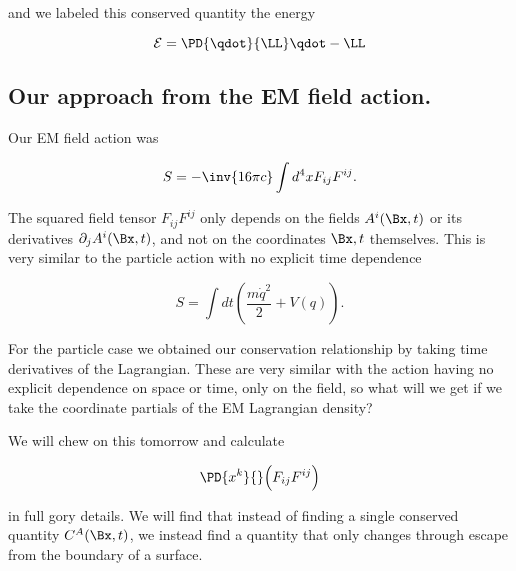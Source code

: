 and we labeled this conserved quantity the energy

\begin{equation}\label{eqn:relativisticElectrodynamicsL21:420}
\mathcal{E} = \PD{\qdot}{\LL} \qdot -\LL 
\end{equation}

\subsection{Our approach from the EM field action.}

Our EM field action was

\begin{equation}\label{eqn:relativisticElectrodynamicsL21:n}
S = -\inv{16 \pi c} \int d^4 x F_{i j} F^{i j}.
\end{equation}

The squared field tensor $F_{i j} F^{i j}$ only depends on the fields $A^i(\Bx, t)$ or its derivatives $\partial_j A^i(\Bx, t)$, and not on the coordinates $\Bx, t$ themselves.  This is very similar to the particle action with no explicit time dependence

\begin{equation}\label{eqn:relativisticElectrodynamicsL21:n}
S = \int dt \left( \frac{m \dot{q}^2}{2} + V(q) \right).
\end{equation}

For the particle case we obtained our conservation relationship by taking time derivatives of the Lagrangian.  These are very similar with the action having no explicit dependence on space or time, only on the field, so what will we get if we take the coordinate partials of the EM Lagrangian density?

We will chew on this tomorrow and calculate 

\begin{equation}\label{eqn:relativisticElectrodynamicsL21:n}
\PD{x^k}{} \Bigl( F_{i j} F^{i j} \Bigr)
\end{equation}

in full gory details.  We will find that instead of finding a single conserved quantity $C^A(\Bx, t)$, we instead find a quantity that only changes through escape from the boundary of a surface.

\EndArticle

